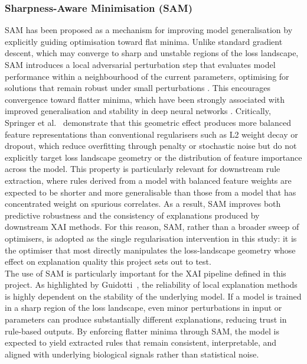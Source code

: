 \subsubsection{Sharpness-Aware Minimisation (SAM)}
\label{ssub:sam-method}
SAM has been proposed as a mechanism for improving model generalisation by explicitly guiding
optimisation toward flat minima. Unlike standard gradient descent, which may converge to sharp and
unstable regions of the loss landscape, SAM introduces a local adversarial perturbation step that
evaluates model performance within a neighbourhood of the current parameters, optimising for solutions
that remain robust under small perturbations \cite{Foret2021}. This encourages convergence toward
flatter minima, which have been strongly associated with improved generalisation and stability in deep
neural networks \cite{Li2018,Keskar2016}. Critically, Springer et al.~\cite{Springer2024} demonstrate
that this geometric effect produces more balanced feature representations than conventional regularisers
such as L2 weight decay or dropout, which reduce overfitting through penalty or stochastic noise but do
not explicitly target loss landscape geometry or the distribution of feature importance across the
model. This property is particularly relevant for downstream rule extraction, where rules derived from a
model with balanced feature weights are expected to be shorter and more generalisable than those from a
model that has concentrated weight on spurious correlates. As a result, SAM improves both predictive
robustness and the consistency of explanations produced by downstream XAI methods. For this reason, SAM,
rather than a broader sweep of optimisers, is adopted as the single regularisation intervention in this
study: it is the optimiser that most directly manipulates the loss-landscape geometry whose effect on
explanation quality this project sets out to test.
\\
The use of SAM is particularly important for the XAI pipeline defined in this project. As highlighted by
Guidotti~\cite{Guidotti2021}, the reliability of local explanation methods is highly dependent on the
stability of the underlying model. If a model is trained in a sharp region of the loss landscape, even
minor perturbations in input or parameters can produce substantially different explanations, reducing
trust in rule-based outputs. By enforcing flatter minima through SAM, the model is expected to yield
extracted rules that remain consistent, interpretable, and aligned with underlying biological signals
rather than statistical noise.